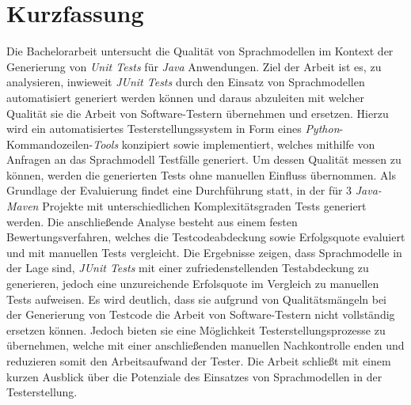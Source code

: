 

\clearpage
\chapter*{Kurzfassung}
Die Bachelorarbeit untersucht die Qualität von Sprachmodellen im Kontext der Generierung von \textit{Unit Tests} für \textit{Java} Anwendungen. Ziel der Arbeit ist es, zu analysieren, inwieweit \textit{JUnit Tests} durch den Einsatz von Sprachmodellen automatisiert generiert werden können und daraus abzuleiten mit welcher Qualität sie die Arbeit von Software-Testern übernehmen und ersetzen. Hierzu wird ein automatisiertes Testerstellungssystem in Form eines \textit{Python}-Kommandozeilen-\textit{Tools} konzipiert sowie implementiert, welches mithilfe von Anfragen an das Sprachmodell Testfälle generiert. Um dessen Qualität messen zu können, werden die generierten Tests ohne manuellen Einfluss übernommen. Als Grundlage der Evaluierung findet eine Durchführung statt, in der für 3 \textit{Java-Maven} Projekte mit unterschiedlichen Komplexitätsgraden Tests generiert werden. Die anschließende Analyse besteht aus einem festen Bewertungsverfahren, welches die Testcodeabdeckung sowie Erfolgsquote evaluiert und mit manuellen Tests vergleicht. Die Ergebnisse zeigen, dass Sprachmodelle in der Lage sind, \textit{JUnit Tests} mit einer zufriedenstellenden Testabdeckung zu generieren, jedoch eine unzureichende Erfolsquote im Vergleich zu manuellen Tests aufweisen. Es wird deutlich, dass sie aufgrund von Qualitätsmängeln bei der Generierung von Testcode die Arbeit von Software-Testern nicht vollständig ersetzen können. Jedoch bieten sie eine Möglichkeit Testerstellungsprozesse zu übernehmen, welche mit einer anschließenden manuellen Nachkontrolle enden und reduzieren somit den Arbeitsaufwand der Tester. Die Arbeit schließt mit einem kurzen Ausblick über die Potenziale des Einsatzes von Sprachmodellen in der Testerstellung.\\\\
